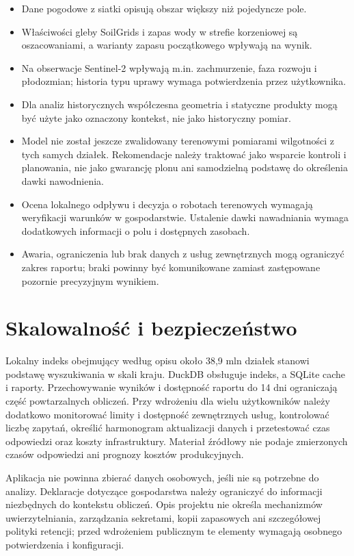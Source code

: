 \documentclass[11pt,a4paper]{article}
\begin{document}
\begin{itemize}
  \item Dane pogodowe z siatki opisują obszar większy niż pojedyncze pole.
  \item Właściwości gleby SoilGrids i zapas wody w strefie korzeniowej są oszacowaniami, a warianty zapasu początkowego wpływają na wynik.
  \item Na obserwacje Sentinel-2 wpływają m.in. zachmurzenie, faza rozwoju i płodozmian; historia typu uprawy wymaga potwierdzenia przez użytkownika.
  \item Dla analiz historycznych współczesna geometria i statyczne produkty mogą być użyte jako oznaczony kontekst, nie jako historyczny pomiar.
  \item Model nie został jeszcze zwalidowany terenowymi pomiarami wilgotności z tych samych działek. Rekomendacje należy traktować jako wsparcie kontroli i planowania, nie jako gwarancję plonu ani samodzielną podstawę do określenia dawki nawodnienia.
  \item Ocena lokalnego odpływu i decyzja o robotach terenowych wymagają weryfikacji warunków w gospodarstwie. Ustalenie dawki nawadniania wymaga dodatkowych informacji o polu i dostępnych zasobach.
  \item Awaria, ograniczenia lub brak danych z usług zewnętrznych mogą ograniczyć zakres raportu; braki powinny być komunikowane zamiast zastępowane pozornie precyzyjnym wynikiem.
\end{itemize}

\section{Skalowalność i bezpieczeństwo}

Lokalny indeks obejmujący według opisu około 38,9 mln działek stanowi podstawę wyszukiwania w skali kraju. DuckDB obsługuje indeks, a SQLite cache i raporty. Przechowywanie wyników i dostępność raportu do 14 dni ograniczają część powtarzalnych obliczeń. Przy wdrożeniu dla wielu użytkowników należy dodatkowo monitorować limity i dostępność zewnętrznych usług, kontrolować liczbę zapytań, określić harmonogram aktualizacji danych i przetestować czas odpowiedzi oraz koszty infrastruktury. Materiał źródłowy nie podaje zmierzonych czasów odpowiedzi ani prognozy kosztów produkcyjnych.

Aplikacja nie powinna zbierać danych osobowych, jeśli nie są potrzebne do analizy. Deklaracje dotyczące gospodarstwa należy ograniczyć do informacji niezbędnych do kontekstu obliczeń. Opis projektu nie określa mechanizmów uwierzytelniania, zarządzania sekretami, kopii zapasowych ani szczegółowej polityki retencji; przed wdrożeniem publicznym te elementy wymagają osobnego potwierdzenia i konfiguracji.
\end{document}
